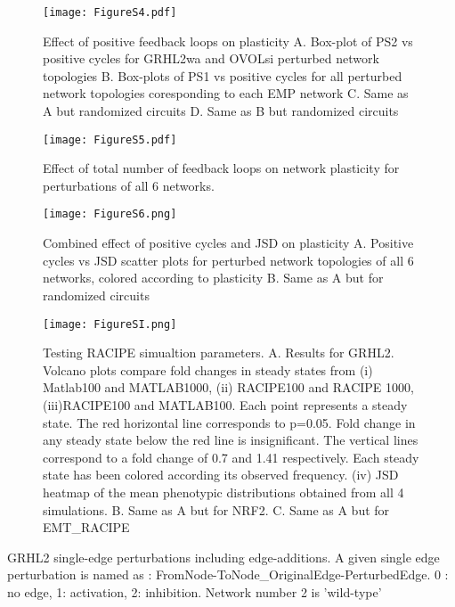 \documentclass[preprint,review,12pt]{elsarticle}
\begin{document}
{		\begin{figure}[!ht]
			\centering
			\texttt{[image: FigureS4.pdf]}
			\caption{Effect of positive feedback loops on plasticity
				A.	 Box-plot of PS2 vs positive cycles for GRHL2wa and OVOLsi perturbed network topologies
				B.	 Box-plots of PS1 vs positive cycles for all perturbed network topologies coresponding to each EMP network
				C.	 Same as A but randomized circuits
				D.	 Same as B but randomized circuits
			}
			\label{figureS4}
		\end{figure}
		
		\begin{figure}[!ht]
			\centering
			\texttt{[image: FigureS5.pdf]}
			\caption{Effect of total number of feedback loops on network plasticity for perturbations of all 6 networks.}
			\label{figureS5}
		\end{figure}
		\begin{figure}[!ht]
			\centering
			\texttt{[image: FigureS6.png]}
			\caption{Combined effect of positive cycles and JSD on plasticity
				A.	Positive cycles vs JSD scatter plots for perturbed network topologies of all 6 networks, colored according to plasticity
				B.	Same as A but for randomized circuits
			}
			\label{figureS6}
		\end{figure}
		\begin{figure}[!ht]
			\centering
			\texttt{[image: FigureSI.png]}
			\caption{\color{red}Testing RACIPE simualtion parameters. 
			A. Results for GRHL2. Volcano plots compare fold changes in steady states from (i)  Matlab100 and MATLAB1000, (ii) RACIPE100 and RACIPE 1000, (iii)RACIPE100 and MATLAB100. Each point represents a steady state. The red horizontal line corresponds to p=0.05. Fold change in any steady state below the red line is insignificant. The vertical lines correspond to a fold change of 0.7 and 1.41 respectively. Each steady state has been colored according its observed frequency. (iv) JSD heatmap of the mean phenotypic distributions obtained from all 4 simulations.
			B. Same as A but for NRF2. C. Same as A but for EMT\_RACIPE\color{black} 
			}
			\label{figureS1}
		\end{figure}
		\newpage
		\begin{table}[h]
			\caption{GRHL2 single-edge perturbations including edge-additions. A given single edge perturbation is named as : FromNode-ToNode\_OriginalEdge-PerturbedEdge. 0 : no edge, 1: activation, 2: inhibition. Network number 2 is 'wild-type'}

\end{table}}
\end{document}
